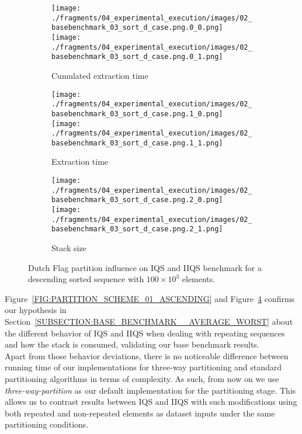 \begin{figure}
    \centering
    \begin{subfigure}[b]{\textwidth}
        \centering
        \texttt{[image: ./fragments/04\_experimental\_execution/images/02\_basebenchmark\_03\_sort\_d\_case.png.0\_0.png]}
        \texttt{[image: ./fragments/04\_experimental\_execution/images/02\_basebenchmark\_03\_sort\_d\_case.png.0\_1.png]}
        \caption{Cumulated extraction time}
        \label{FIG:PARTITION_SCHEME_01_DESCENDING__0_0}
    \end{subfigure}

    \begin{subfigure}[b]{\textwidth}
        \centering
        \texttt{[image: ./fragments/04\_experimental\_execution/images/02\_basebenchmark\_03\_sort\_d\_case.png.1\_0.png]}
        \texttt{[image: ./fragments/04\_experimental\_execution/images/02\_basebenchmark\_03\_sort\_d\_case.png.1\_1.png]}
        \caption{Extraction time}
        \label{FIG:PARTITION_SCHEME_01_DESCENDING__0_1}
    \end{subfigure}

    \begin{subfigure}[b]{\textwidth}
        \centering
        \texttt{[image: ./fragments/04\_experimental\_execution/images/02\_basebenchmark\_03\_sort\_d\_case.png.2\_0.png]}
        \texttt{[image: ./fragments/04\_experimental\_execution/images/02\_basebenchmark\_03\_sort\_d\_case.png.2\_1.png]}
        \caption{Stack size}
        \label{FIG:PARTITION_SCHEME_01_DESCENDING__0_2}
    \end{subfigure}
    
    \caption{Dutch Flag partition influence on IQS and IIQS benchmark for a descending sorted sequence with $100\times10^3$ elements.}
    \label{FIG:PARTITION_SCHEME_01_DESCENDING}
\end{figure}


Figure~\ref{FIG:PARTITION_SCHEME_01_ASCENDING} and Figure~\ref{FIG:PARTITION_SCHEME_01_DESCENDING} confirms our hypothesis in Section~\ref{SUBSECTION:BASE_BENCHMARK__AVERAGE_WORST} about the different behavior of IQS and IIQS when dealing with repeating sequences and how the stack is consumed, validating our base benchmark results.\\

Apart from those behavior deviations, there is no noticeable difference between running time of our implementations for three-way partitioning and standard partitioning algorithms in terms of complexity. As such, from now on we use \textit{three-way-partition} as our default implementation for the partitioning stage. This allows us to contrast results between IQS and IIQS with such modifications using both repeated and non-repeated elements as dataset inputs under the same partitioning conditions.\\

\FloatBarrier